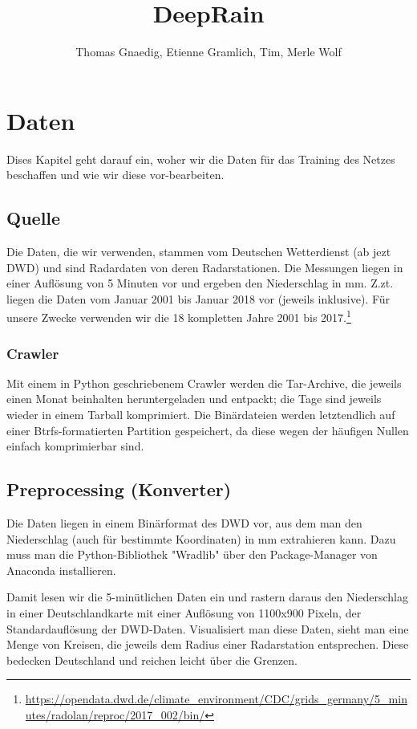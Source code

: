 \documentclass[11pt]{article}
\title{DeepRain}
\author{Thomas Gnaedig, Etienne Gramlich, Tim, Merle Wolf}
\begin{document}
\maketitle

\section{Daten}
Dises Kapitel geht darauf ein, woher wir die Daten für das Training des Netzes beschaffen und wie wir diese vor-bearbeiten.

\subsection{Quelle}
Die Daten, die wir verwenden, stammen vom Deutschen Wetterdienst (ab jezt DWD) und sind Radardaten von deren Radarstationen. Die Messungen liegen in einer Auflösung von 5 Minuten vor und ergeben den Niederschlag in mm. Z.zt. liegen die Daten vom Januar 2001 bis Januar 2018 vor (jeweils inklusive). Für unsere Zwecke verwenden wir die 18 kompletten Jahre 2001 bis 2017.\footnote{\url{https://opendata.dwd.de/climate\_environment/CDC/grids\_germany/5\_minutes/radolan/reproc/2017\_002/bin/}}

\subsubsection{Crawler}
Mit einem in Python geschriebenem Crawler werden die Tar-Archive, die jeweils einen Monat beinhalten heruntergeladen und entpackt; die Tage sind jeweils wieder in einem Tarball komprimiert. Die Binärdateien werden letztendlich auf einer Btrfs-formatierten Partition gespeichert, da diese wegen der häufigen Nullen einfach komprimierbar sind.

\subsection{Preprocessing (Konverter)}
Die Daten liegen in einem Binärformat des DWD vor, aus dem man den Niederschlag (auch für bestimmte Koordinaten) in mm extrahieren kann. Dazu muss man die Python-Bibliothek "Wradlib" über den Package-Manager von Anaconda installieren.

Damit lesen wir die 5-minütlichen Daten ein und rastern daraus den Niederschlag in einer Deutschlandkarte mit einer Auflösung von 1100x900 Pixeln, der Standardauflösung der DWD-Daten. Visualisiert man diese Daten, sieht man eine Menge von Kreisen, die jeweils dem Radius einer Radarstation entsprechen. Diese bedecken Deutschland und reichen leicht über die Grenzen.
\end{document}

